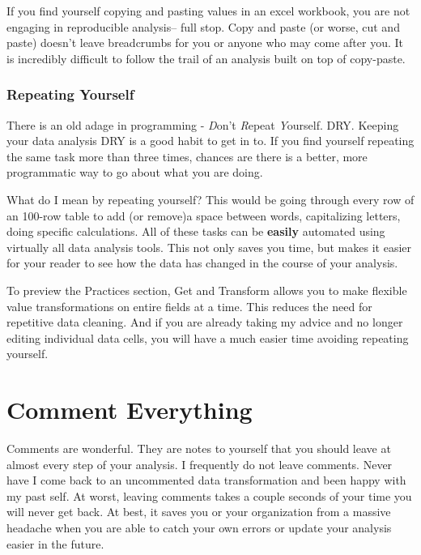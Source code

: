\documentclass[]{book}
\begin{document}
If you find yourself copying and pasting values in an excel workbook, you are not engaging in reproducible analysis-- full stop. Copy and paste (or worse, cut and paste) doesn't leave breadcrumbs for you or anyone who may come after you. It is incredibly difficult to follow the trail of an analysis built on top of copy-paste.

\hypertarget{repeating-yourself}{%
\subsubsection{Repeating Yourself}\label{repeating-yourself}}

There is an old adage in programming - \emph{D}on't \emph{R}epeat \emph{Y}ourself. DRY. Keeping your data analysis DRY is a good habit to get in to. If you find yourself repeating the same task more than three times, chances are there is a better, more programmatic way to go about what you are doing.

What do I mean by repeating yourself? This would be going through every row of an 100-row table to add (or remove)a space between words, capitalizing letters, doing specific calculations. All of these tasks can be \textbf{easily} automated using virtually all data analysis tools. This not only saves you time, but makes it easier for your reader to see how the data has changed in the course of your analysis.

To preview the Practices section, Get and Transform allows you to make flexible value transformations on entire fields at a time. This reduces the need for repetitive data cleaning. And if you are already taking my advice and no longer editing individual data cells, you will have a much easier time avoiding repeating yourself.

\hypertarget{comment-everything}{%
\section{Comment Everything}\label{comment-everything}}

Comments are wonderful. They are notes to yourself that you should leave at almost every step of your analysis. I frequently do not leave comments. Never have I come back to an uncommented data transformation and been happy with my past self. At worst, leaving comments takes a couple seconds of your time you will never get back. At best, it saves you or your organization from a massive headache when you are able to catch your own errors or update your analysis easier in the future.
\end{document}
